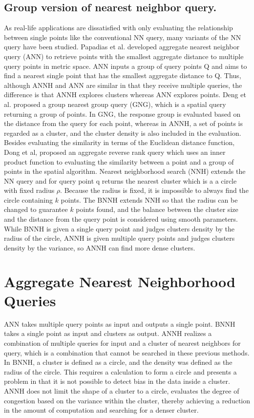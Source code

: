 \documentclass[a4paper,11pt]{report}
\theoremstyle{mytheoremstyle}
\begin{document}
\section{Group version of nearest neighbor query.}
As real-life applications are dissatisfied with only evaluating the relationship between single points like the conventional NN query, many variants of the NN query have been studied. Papadias et al. developed aggregate nearest neighbor query (ANN) \cite{ANN} to retrieve points with the smallest aggregate distance to multiple query points in metric space. ANN inputs a group of query points Q and aims to find a nearest single point that has the smallest aggregate distance to Q. Thus, although ANNH and ANN are similar in that they receive multiple queries, the difference is that ANNH explores clusters whereas ANN explores points. Deng et al. \cite{GNG} proposed a group nearest group query (GNG), which is a spatial query returning a group of points. In GNG, the response group is evaluated based on the distance from the query for each point, whereas in ANNH, a set of points is regarded as a cluster, and the cluster density is also included in the evaluation. Besides evaluating the similarity in terms of the Euclidean distance function, Dong et al, \cite{dong2017grid} proposed an aggregate reverse rank query which uses an inner product function to evaluating the similarity between a point and a group of points in the spatial algorithm. Nearest neighborhood search (NNH) \cite{NNH} extends the NN query and for query point q returns the nearest cluster which is a a circle with fixed radius $\rho$. Because the radius is fixed, it is impossible to
always find the circle containing $k$ points. The BNNH \cite{BNNH} extends NNH so that the radius can be changed to guarantee $k$ points found, and the balance between the cluster size and the distance from the query point is considered using smooth parameters. While BNNH is given a single query point and judges clusters density by the radius of the circle, ANNH is given multiple query points and judges clusters density by the variance, so ANNH can find more dense clusters.

\chapter{Aggregate Nearest Neighborhood Queries}
\label{section:annh}
ANN \cite {ANN} takes multiple query points as input and outputs a single point. BNNH \cite{BNNH} takes a single point as input and clusters as output. ANNH realizes a combination of multiple queries for input and a cluster of nearest neighbors for query, which is a combination that cannot be searched in these previous methods.
In BNNH, a cluster is defined as a circle, and the density was defined as the radius of the circle. This requires a calculation to form a circle and presents a problem in that it is not possible to detect bias in the data inside a cluster. ANNH does not limit the shape of a cluster to a circle, evaluates the degree of congestion based on the variance within the cluster, thereby achieving a reduction in the amount of computation and searching for a denser cluster.
\end{document}
